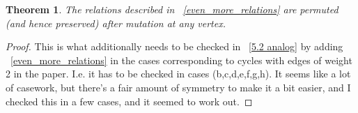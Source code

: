 \documentclass[11pt]{amsart}
\newtheorem{thm}{Theorem}[section]
\theoremstyle{definition}
\begin{document}
\begin{thm}
\label{square_mutation_preserved}
The relations described in ~\ref{even_more_relations} are permuted (and hence preserved) after mutation at any vertex.
\end{thm}
\begin{proof}
This is what additionally needs to be checked in ~\ref{5.2 analog} by adding ~\ref{even_more_relations} in the cases corresponding to cycles with edges of weight 2 in the paper. I.e. it has to be checked in cases (b,c,d,e,f,g,h). It seems like a lot of casework, but there's a fair amount of symmetry to make it a bit easier, and I checked this in a few cases, and it seemed to work out. 
\end{proof}
\end{document}
